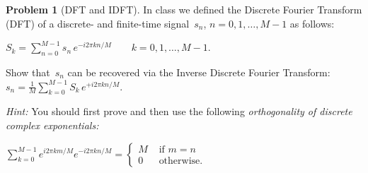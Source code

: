 \documentclass[11pt]{article}
\theoremstyle{plain}
\theoremstyle{definition}
\newtheorem{problem}{Problem}
\theoremstyle{remark}
\begin{document}
\begin{problem}[DFT and IDFT]
In class we defined the Discrete Fourier Transform (DFT) of
a discrete- and finite-time signal~$s_n$, $n=0,1,\ldots, M-1$
as follows:
\par\vspace{.15cm}
\hfill
$
\displaystyle
S_k = 
\sum_{n=0}^{M-1}s_n\,e^{-i2\pi kn/M}
\qquad
k=0,1,\ldots, M-1.
$
\hfill\mbox{ }
\par\vspace{-.25cm}
Show that~$s_n$ can be recovered via
the Inverse Discrete Fourier Transform:
$\displaystyle
s_n=\frac{1}{M}
\sum_{k=0}^{M-1}S_k\,e^{+i2\pi kn/M}.
$
\par\vspace{.15cm}
{\em Hint:} You should first prove and then 
use the following \em orthogonality \em of
discrete complex exponentials:
\par\vspace{.15cm}
\hfill
$
\displaystyle
\sum_{k=0}^{M-1}
e^{i2\pi km/M}
e^{-i2\pi kn/M}=
\left\{
\begin{array}{ll}
M&\mbox{ if }m=n\\
0 &\mbox{ otherwise}.
\end{array}
\right.
$
\hfill\mbox{ }
\end{problem}
\end{document}
